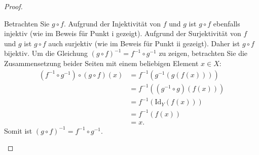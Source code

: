 \documentclass{../problemset}
\begin{document}
\begin{problem}
\begin{proof}
\begin{enumerate}
		      Betrachten Sie $g \circ f$. Aufgrund der Injektivität von $f$ und $g$ ist $g \circ f$ ebenfalls injektiv (wie im Beweis für Punkt i gezeigt).
		      Aufgrund der Surjektivität von $f$ und $g$ ist $g \circ f$ auch surjektiv (wie im Beweis für Punkt ii gezeigt).
		      Daher ist $g \circ f$ bijektiv. Um die Gleichung ${(g \circ f )}^{-1} = f^{-1} \circ g^{-1}$ zu zeigen, betrachten Sie die Zusammensetzung beider Seiten mit einem beliebigen Element $x \in X$:
		      \begin{align*}
			      \left(f^{-1} \circ g^{-1}\right) \circ (g \circ f)(x) & = f^{-1}\left(g^{-1}(g(f(x)))\right)        \\
			                                                            & = f^{-1}\left((g^{-1} \circ g)(f(x))\right) \\
			                                                            & = f^{-1}\left(\text{Id}_Y(f(x))\right)      \\
			                                                            & = f^{-1}(f(x))                              \\
			                                                            & = x.
		      \end{align*}
		      Somit ist ${(g \circ f )}^{-1} = f^{-1} \circ g^{-1}$. \checkmark


\end{enumerate}
\end{proof}
\end{problem}
\end{document}
